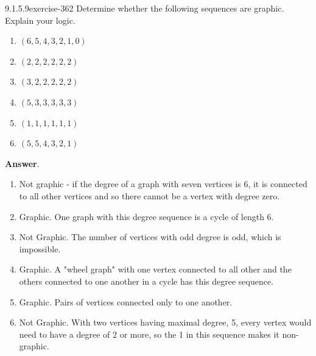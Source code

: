 \documentclass[twoside,10pt,]{book}
\numberwithin{equation}{section}
\begin{document}
\begin{divisionsolution}{9.1.5.9}{}{exercise-362}%
\hypertarget{p-3087}{}%
Determine whether the following sequences are graphic. Explain your logic.%
\par
\hypertarget{p-3088}{}%
\leavevmode%
\begin{enumerate}[label=(\alph*)]
\item\hypertarget{li-1495}{}\hypertarget{p-3089}{}%
\((6, 5, 4, 3, 2, 1, 0)\)%
\item\hypertarget{li-1496}{}\hypertarget{p-3090}{}%
\((2,2,2,2,2,2)\)%
\item\hypertarget{li-1497}{}\hypertarget{p-3091}{}%
\((3,2,2,2,2,2)\)%
\item\hypertarget{li-1498}{}\hypertarget{p-3092}{}%
\((5,3,3,3,3,3)\)%
\item\hypertarget{li-1499}{}\hypertarget{p-3093}{}%
\((1,1,1,1,1,1)\)%
\item\hypertarget{li-1500}{}\hypertarget{p-3094}{}%
\((5,5,4,3,2,1)\)%
\end{enumerate}
%
\par\smallskip%
\noindent\textbf{Answer}.\quad%
\hypertarget{p-3095}{}%
\leavevmode%
\begin{enumerate}[label=(\alph*)]
\item\hypertarget{li-1501}{}\hypertarget{p-3096}{}%
Not graphic - if the degree of a graph with seven vertices is 6, it is connected to all other vertices and so there cannot be a vertex with degree zero.%
\item\hypertarget{li-1502}{}\hypertarget{p-3097}{}%
Graphic.  One graph with this degree sequence is a cycle of length 6.%
\item\hypertarget{li-1503}{}\hypertarget{p-3098}{}%
Not Graphic. The number of vertices with odd degree is odd, which is impossible.%
\item\hypertarget{li-1504}{}\hypertarget{p-3099}{}%
Graphic.  A "wheel graph" with one vertex connected to all other and the others connected to one another in a cycle has this degree sequence.%
\item\hypertarget{li-1505}{}\hypertarget{p-3100}{}%
Graphic.  Pairs of vertices connected only to one another.%
\item\hypertarget{li-1506}{}\hypertarget{p-3101}{}%
Not Graphic.  With two vertices having maximal degree, 5, every vertex would need to have a degree of 2 or more, so the 1 in this sequence makes it non-graphic.%
\end{enumerate}
%
\end{divisionsolution}%
\end{document}

